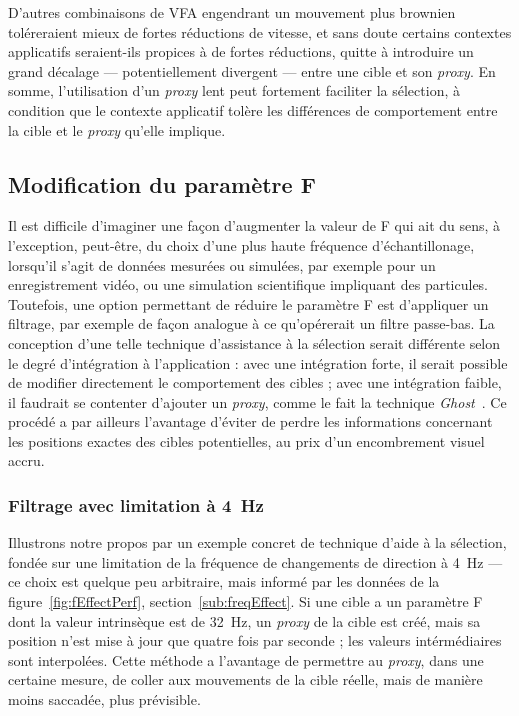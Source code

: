	D'autres combinaisons de VFA engendrant un mouvement plus \og brownien \fg{} toléreraient mieux de fortes réductions de vitesse, et sans doute certains contextes applicatifs seraient-ils propices à de fortes réductions, quitte à introduire un grand décalage --- potentiellement divergent --- entre une cible et son \emph{proxy}. En somme, l'utilisation d'un \emph{proxy} lent peut fortement faciliter la sélection, à condition que le contexte applicatif tolère les différences de comportement entre la cible et le \emph{proxy} qu'elle implique.
	
	\subsection{Modification du paramètre F}
	Il est difficile d'imaginer une façon d'augmenter la valeur de F qui ait du sens, à l'exception, peut-être, du choix d'une plus haute fréquence d'échantillonage, lorsqu'il s'agit de données mesurées ou simulées, par exemple pour un enregistrement vidéo, ou une simulation scientifique impliquant des particules. Toutefois, une option permettant de réduire le paramètre F est d'appliquer un filtrage, par exemple de façon analogue à ce qu'opérerait un filtre passe-bas. La conception d'une telle technique d'assistance à la sélection serait différente selon le degré d'intégration à l'application : avec une intégration forte, il serait possible de modifier directement le comportement des cibles ; avec une intégration faible, il faudrait se contenter d'ajouter un \emph{proxy}, comme le fait la technique \emph{Ghost}~\cite{hasan2011comet}. Ce procédé a par ailleurs l'avantage d'éviter de perdre les informations concernant les positions exactes des cibles potentielles, au prix d'un encombrement visuel accru.
	
	\subsubsection{Filtrage avec limitation à 4~Hz}
	Illustrons notre propos par un exemple concret de technique d'aide à la sélection, fondée sur une limitation de la fréquence de changements de direction à 4~Hz --- ce choix est quelque peu arbitraire, mais informé par les données de la figure~\ref{fig:fEffectPerf}, section~\ref{sub:freqEffect}. Si une cible a un paramètre F dont la valeur intrinsèque est de 32~Hz, un \emph{proxy} de la cible est créé, mais sa position n'est mise à jour que quatre fois par seconde ; les valeurs intérmédiaires sont interpolées. Cette méthode a l'avantage de permettre au \emph{proxy}, dans une certaine mesure, de \og coller \fg{} aux mouvements de la cible réelle, mais de manière moins saccadée, plus prévisible.
	
